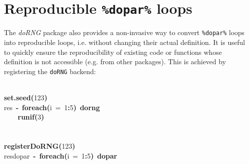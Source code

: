 \documentclass[a4paper,12pt]{article}\usepackage{graphicx, color}
\makeatletter
\newcommand{\hlnumber}[1]{\textcolor[rgb]{0,0,0}{#1}}%
\newcommand{\hlfunctioncall}[1]{\textcolor[rgb]{0.501960784313725,0,0.329411764705882}{\textbf{#1}}}%
\newcommand{\hlkeyword}[1]{\textcolor[rgb]{0,0,0}{\textbf{#1}}}%
\newcommand{\hlargument}[1]{\textcolor[rgb]{0.690196078431373,0.250980392156863,0.0196078431372549}{#1}}%
\newcommand{\hlassignement}[1]{\textcolor[rgb]{0,0,0}{\textbf{#1}}}%
\newcommand{\hlsymbol}[1]{\textcolor[rgb]{0,0,0}{#1}}%
\newcommand{\hlstd}[1]{\textcolor[rgb]{0,0,0}{#1}}%
\newenvironment{kframe}{%
 \def\FrameCommand##1{\hskip\@totalleftmargin \hskip-\fboxsep
 \colorbox{shadecolor}{##1}\hskip-\fboxsep
     \hskip-\linewidth \hskip-\@totalleftmargin \hskip\columnwidth}%
 \MakeFramed {\advance\hsize-\width
   \@totalleftmargin\z@ \linewidth\hsize
   \@setminipage}}%
 {\par\unskip\endMakeFramed}
\newenvironment{knitrout}{}{} %
\renewenvironment{knitrout}{\begin{footnotesize}}{\end{footnotesize}}
\let\code=\texttt
\newcommand{\pkgname}[1]{\textit{#1}\xspace}
\newcommand{\Rpkg}[1]{\pkgname{#1} package\xspace}
\makeatother
\begin{document}
\section{Reproducible \texttt{\%dopar\%} loops}

The \Rpkg{doRNG} also provides a non-invasive way to convert \code{\%dopar\%}
loops into reproducible loops, i.e. without changing their actual definition.
It is useful to quickly ensure the reproducibility of existing code or functions
whose definition is not accessible (e.g. from other packages).
This is achieved by registering the \code{doRNG} backend:

\begin{knitrout}
\color{fgcolor}\begin{kframe}
\begin{flushleft}
\ttfamily\noindent
\hspace*{\fill}\\
\hlstd{}\hlfunctioncall{set.seed}\hlkeyword{(}\hlnumber{123}\hlkeyword{)}\hspace*{\fill}\\
\hlstd{}\hlsymbol{res}{\ }\hlassignement{\usebox{\hlnormalsizeboxlessthan}-}{\ }\hlfunctioncall{foreach}\hlkeyword{(}\hlargument{i}{\ }\hlargument{=}{\ }\hlnumber{1}\hlkeyword{:}\hlnumber{5}\hlkeyword{)}{\ }\hlkeyword{\usebox{\hlnormalsizeboxpercent}dorng\usebox{\hlnormalsizeboxpercent}}{\ }\hlkeyword{\usebox{\hlnormalsizeboxopenbrace}}\hspace*{\fill}\\
\hlstd{}{\ }{\ }{\ }{\ }\hlfunctioncall{runif}\hlkeyword{(}\hlnumber{3}\hlkeyword{)}\hspace*{\fill}\\
\hlstd{}\hlkeyword{\usebox{\hlnormalsizeboxclosebrace}}\hspace*{\fill}\\
\hlstd{}\hspace*{\fill}\\
\hlstd{}\hlfunctioncall{registerDoRNG}\hlkeyword{(}\hlnumber{123}\hlkeyword{)}\hspace*{\fill}\\
\hlstd{}\hlsymbol{res\usebox{\hlnormalsizeboxunderscore}dopar}{\ }\hlassignement{\usebox{\hlnormalsizeboxlessthan}-}{\ }\hlfunctioncall{foreach}\hlkeyword{(}\hlargument{i}{\ }\hlargument{=}{\ }\hlnumber{1}\hlkeyword{:}\hlnumber{5}\hlkeyword{)}{\ }\hlkeyword{\usebox{\hlnormalsizeboxpercent}dopar\usebox{\hlnormalsizeboxpercent}}{\ }\hlkeyword{\usebox{\hlnormalsizeboxopenbrace}}\hspace*{\fill}\\

\end{flushleft}
\end{kframe}
\end{knitrout}
\end{document}
